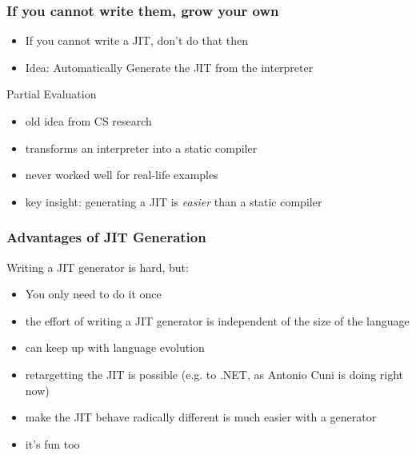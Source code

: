 \documentclass[utf8x]{beamer}
\begin{document}
\begin{frame}
  \frametitle{If you cannot write them, grow your own}
  \begin{itemize}
  \item If you cannot write a JIT, don't do that then
  \pause
  \item Idea: Automatically Generate the JIT from the interpreter
  \pause
  \end{itemize}
  \begin{block}{
    Partial Evaluation}
    \begin{itemize}
    \item old idea from CS research
    \item transforms an interpreter into a static compiler
    \item never worked well for real-life examples
    \item key insight: generating a JIT is \emph{easier} than a static compiler
    \end{itemize}
  \end{block}
 
\end{frame}

\begin{frame}
  \frametitle{Advantages of JIT Generation}
  Writing a JIT generator is hard, but:
  \begin{itemize}
  \item You only need to do it once
  \item the effort of writing a JIT generator is independent of the size of the language
  \item can keep up with language evolution
  \item retargetting the JIT is possible (e.g. to .NET, as Antonio Cuni is doing right now)
  \item make the JIT behave radically different is much easier with a generator
  \item it's fun too
  \end{itemize}
\end{frame}
\end{document}
